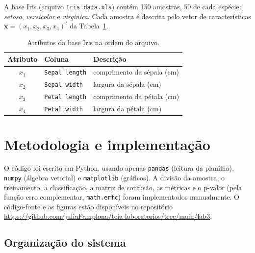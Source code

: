 \documentclass[12pt,a4paper]{article}
\newcommand{\repositorio}{\url{https://github.com/juliaPamplona/teia-laboratorios/tree/main/lab3}}
\newcommand{\setosa}{\emph{setosa}}
\newcommand{\versicolor}{\emph{versicolor}}
\newcommand{\virginica}{\emph{virginica}}
\begin{document}
A base Iris (arquivo \texttt{Iris data.xls}) contém 150 amostras, 50 de cada espécie: \setosa{}, \versicolor{} e \virginica{}. Cada amostra é descrita pelo vetor de características $\mathbf{x} = (x_1, x_2, x_3, x_4)^t$ da Tabela~\ref{tab:atributos}.

\begin{table}[H]
\centering
\caption{Atributos da base Iris na ordem do arquivo.}
\label{tab:atributos}
\begin{tabular}{cll}
\toprule
Atributo & Coluna & Descrição \\
\midrule
$x_1$ & \texttt{Sepal length} & comprimento da sépala (cm) \\
$x_2$ & \texttt{Sepal width}  & largura da sépala (cm) \\
$x_3$ & \texttt{Petal length} & comprimento da pétala (cm) \\
$x_4$ & \texttt{Petal width}  & largura da pétala (cm) \\
\bottomrule
\end{tabular}
\end{table}

\section{Metodologia e implementação}

O código foi escrito em Python, usando apenas \texttt{pandas} (leitura da planilha), \texttt{numpy} (álgebra vetorial) e \texttt{matplotlib} (gráficos). A divisão da amostra, o treinamento, a classificação, a matriz de confusão, as métricas e o p-valor (pela função erro complementar, \texttt{math.erfc}) foram implementados manualmente. O código-fonte e as figuras estão disponíveis no repositório \repositorio.

\subsection{Organização do sistema}
\end{document}
